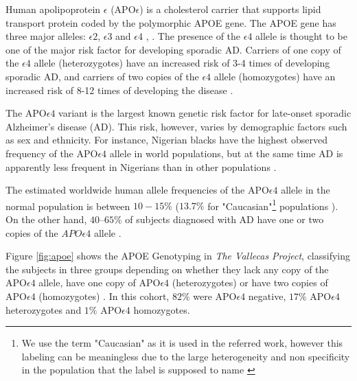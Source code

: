\documentclass[11pt]{article}
\theoremstyle{definition}
\theoremstyle{remark}
\begin{document}
Human apolipoprotein $\epsilon$ (APO$\epsilon$) is a cholesterol carrier that supports lipid transport protein coded by the polymorphic APOE gene. The APOE gene has three major alleles: $\epsilon2$, $\epsilon3$ and $\epsilon4$ \cite{mahley2000apolipoprotein}, \cite{hauser2011apolipoprotein}. The presence of the $\epsilon4$ allele is thought to be one of the major risk factor for developing sporadic AD. Carriers of one copy of the  $\epsilon4$ allele (heterozygotes) have an increased risk of 3-4 times of developing sporadic AD, and carriers of two copies of the $\epsilon4$ allele (homozygotes) have an increased risk of 8-12 times of developing the disease \cite{heffernan2016neurobiology}. 

The APO$\epsilon4$ variant is the largest known genetic risk factor for late-onset sporadic Alzheimer's disease (AD). This risk, however, varies by demographic factors such as sex and ethnicity. For instance, Nigerian blacks have the highest observed frequency of the APO$\epsilon4$ allele in world populations, but at the same time AD is apparently less frequent in Nigerians than in other populations \cite{sepehrnia1989genetic}.

The estimated worldwide human allele frequencies of the APO$\epsilon4$ allele in the normal population is between $10-15\%$\cite{myers1996apolipoprotein} ($13.7\%$ for "Caucasian"\footnote{We use the term "Caucasian" as it is used in the referred work, however this labeling can be meaningless due to the large heterogeneity and non specificity in the population that the label is supposed to name \cite{bhopal1998white}} populations \cite{corder1994protective}). 
On the other hand, $40–65\%$ of subjects diagnosed with AD have one or two copies of the $APO\epsilon4$ allele \cite{saunders1993association}. 

Figure \ref{fig:apoe} shows the APOE Genotyping in \emph{The Vallecas Project}, classifying the subjects in three groups depending on whether they lack any copy of the APO$\epsilon4$ allele, have one copy of APO$\epsilon4$ (heterozygotes) or have two copies of APO$\epsilon4$ (homozygotes) \cite{farrer1997effects}. In this cohort, $82\%$ were APO$\epsilon4$ negative, $17\%$ APO$\epsilon4$ heterozygotes and $1\%$ APO$\epsilon4$ homozygotes. 
\end{document}
